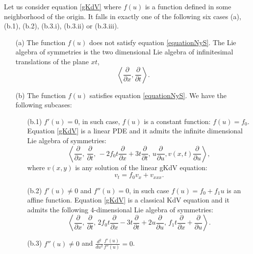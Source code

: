 \documentclass[
11pt,%
tightenlines,%
twoside,%
onecolumn,%
nofloats,%
nobibnotes,%
nofootinbib,%
superscriptaddress,%
noshowpacs,%
centertags]%
{revtex4}
\begin{document}
\begin{theorem}
Let us consider equation \eqref{gKdV} where $f(u)$ is a function defined in some neighborhood of the origin. It falls in exactly one of the following six cases (a), (b.1), (b.2), (b.3.i), (b.3.ii) or (b.3.iii).
\begin{itemize}
\item[(a)] The function $f(u)$ does not satisfy equation \eqref{equationNyS}. The Lie algebra of symmetries is the two dimensional Lie algebra of infinitesimal translations of the plane $xt$,
$$\left\langle\frac{\partial}{\partial x},\frac{\partial}{\partial t}\right\rangle.$$
\item[(b)] The function $f(u)$ satisfies equation \eqref{equationNyS}. We have the following subcases:
\begin{itemize}
\item[(b.1)] $f'(u) = 0$, in such case, $f(u)$ is a constant function: $f(u) = f_0$. Equation \eqref{gKdV} is a linear PDE and it admits the infinite dimensional Lie algebra of symmetries:
$$\left\langle\frac{\partial}{\partial x},\, \frac{\partial}{\partial t},\,
-2f_0 t\frac{\partial}{\partial x} + 3t\frac{\partial}{\partial t},\, 
u\frac{\partial}{\partial u}, v(x,t) \frac{\partial}{\partial u}\right\rangle,$$
where $v(x,y)$ is any solution of the linear gKdV equation:
$$v_t = f_0v_x + v_{xxx}.$$
\item[(b.2)] $f'(u) \neq 0$ and $f''(u) = 0$, in such case $f(u) = f_0 + f_1u$ is an affine function. Equation  \eqref{gKdV} is a classical KdV equation and it admits the following $4$-dimensional Lie algebra of symmetries:
$$\left\langle\frac{\partial}{\partial x},\, \frac{\partial}{\partial t},\,
2f_0 t\frac{\partial}{\partial x} - 3t\frac{\partial}{\partial t} + 2u \frac{\partial}{\partial u},\, 
f_1t\frac{\partial}{\partial x} + \frac{\partial}{\partial u}\right\rangle. $$
\item[(b.3)] $f''(u) \neq 0$ and $\frac{d^2}{du^2}\frac{f'(u)}{f''(u)} = 0$.


\end{itemize}
\end{itemize}
\end{theorem}
\end{document}
